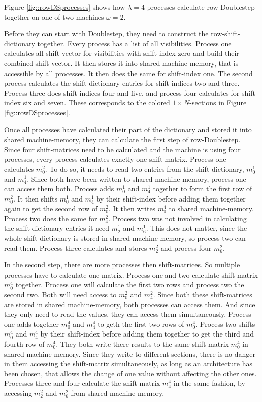 \documentclass[12pt]{article}
\begin{document}
Figure \ref{fig::rowDSprocesses} shows how $\lambda=4$ processes calculate row-Doublestep together on one of two machines $\omega=2$.

Before they can start with Doublestep, they need to construct the row-shift-dictionary together. Every process has a list of all visibilities. Process one calculates all shift-vector for visibilities with shift-index zero and build their combined shift-vector. It then stores it into shared machine-memory, that is accessible by all processes. It then does the same for shift-index one. The second process calculates the shift-dictionary entries for shift-indices two and three. Process three does shift-indices four and five, and process four calculates for shift-index six and seven. These corresponds to the colored $1 \times N$-sections in Figure \ref{fig::rowDSprocesses}.

Once all processes have calculated their part of the dictionary and stored it into shared machine-memory, they can calculate the first step of row-Doublestep. Since four shift-matrices need to be calculated and the machine is using four processes, every process calculates exactly one shift-matrix. Process one calculates $m_0^2$. To do so, it needs to read two entries from the shift-dictionary, $m_0^1$ and $m_4^1$. Since both have been written to shared machine-memory, process one can access them both. Process adds $m_0^1$ and $m_4^1$ together to form the first row of $m_0^2$. It then shifts $m_0^1$ and $m_4^1$ by their shift-index before adding them together again to get the second row of $m_0^2$. 
It then writes $m_0^4$ to shared machine-memory. Process two does the same for $m_4^2$. Process two was not involved in calculating the shift-dictionary entries it need $m_2^1$ and $m_6^1$. This does not matter, since the whole shift-dictionary is stored in shared machine-memory, so process two can read them. Process three calculates and stores $m_2^2$ and process four $m_6^2$.

In the second step, there are more processes then shift-matrices. So multiple processes have to calculate one matrix. Process one and two calculate shift-matrix $m_0^4$ together. Process one will calculate the first two rows and process two the second two. Both will need access to $m_0^2$ and $m_4^2$. Since both these shift-matrices are stored in shared machine-memory, both processes can access them. And since they only need to read the values, they can access them simultaneously. Process one adds together $m_0^4$ and $m_4^4$ to geth the first two rows of $m_0^4$. Process two shifts $m_0^4$ and $m_4^4$ by their shift-index before adding them together to get the third and fourth row of $m_0^4$. They both write there results to the same shift-matrix $m_0^4$ in shared machine-memory. Since they write to different sections, there is no danger in them accessing the shift-matrix simultaneously, as long as an architecture has been chosen, that allows the change of one value without affecting the other ones. Processes three and four calculate the shift-matrix $m_4^4$ in the same fashion, by accessing $m_2^2$ and $m_6^2$ from shared machine-memory.
\end{document}
